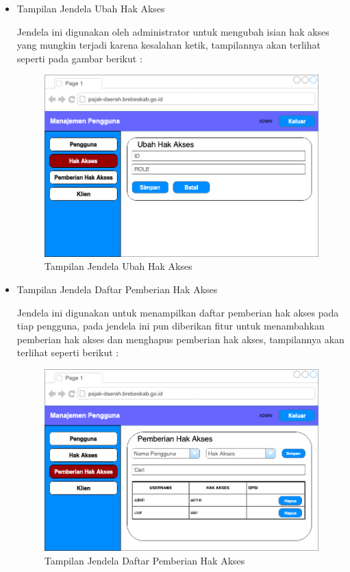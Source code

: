 \documentclass[pdftex,12pt, oneside]{article}
\begin{document}
\begin{itemize}
	\item Tampilan Jendela Ubah Hak Akses
	
	Jendela ini digunakan oleh administrator untuk mengubah isian hak akses yang mungkin terjadi karena kesalahan ketik, tampilannya akan terlihat seperti pada gambar berikut :
	
	\begin{figure}[H]
		\centering
		\includegraphics[width=1\textwidth]{./resources/edit-role-ui}
		\caption{Tampilan Jendela Ubah Hak Akses}
		\label{fig:edit-role-ui}
	\end{figure}
	
	\item Tampilan Jendela Daftar Pemberian Hak Akses
	
	Jendela ini digunakan untuk menampilkan daftar pemberian hak akses pada tiap pengguna, pada jendela ini pun diberikan fitur untuk menambahkan pemberian hak akses dan menghapus pemberian hak akses, tampilannya akan terlihat seperti berikut :
	
	\begin{figure}[H]
		\centering
		\includegraphics[width=1\textwidth]{./resources/assign-role-ui}
		\caption{Tampilan Jendela Daftar Pemberian Hak Akses}
		\label{fig:assign-role-ui}
	\end{figure}
	

\end{itemize}
\end{document}
